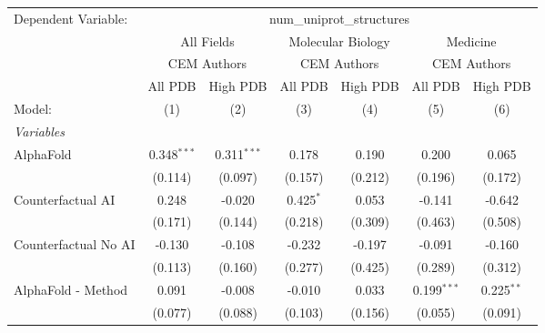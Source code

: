 \begingroup
\centering
\begin{tabular}{lcccccc}
   \tabularnewline \midrule \midrule
   Dependent Variable: & \multicolumn{6}{c}{num\_uniprot\_structures}\\
 & \multicolumn{2}{c}{All Fields} & \multicolumn{2}{c}{Molecular Biology} & \multicolumn{2}{c}{Medicine} \\
\cmidrule(lr){2-3} \cmidrule(lr){4-5} \cmidrule(lr){6-7}
 & \multicolumn{2}{c}{CEM Authors} & \multicolumn{2}{c}{CEM Authors} & \multicolumn{2}{c}{CEM Authors} \\
\cmidrule(lr){2-3} \cmidrule(lr){4-5} \cmidrule(lr){6-7}
 & \multicolumn{1}{c}{All PDB} & \multicolumn{1}{c}{High PDB} & \multicolumn{1}{c}{All PDB} & \multicolumn{1}{c}{High PDB} & \multicolumn{1}{c}{All PDB} & \multicolumn{1}{c}{High PDB} \\
\cmidrule(lr){2-2} \cmidrule(lr){3-3} \cmidrule(lr){4-4} \cmidrule(lr){5-5} \cmidrule(lr){6-6} \cmidrule(lr){7-7}
   Model:                                                     & (1)           & (2)           & (3)          & (4)     & (5)            & (6)\\  
   \midrule
   \emph{Variables}\\
   AlphaFold                                                  & 0.348$^{***}$ & 0.311$^{***}$ & 0.178        & 0.190   & 0.200          & 0.065\\   
                                                              & (0.114)       & (0.097)       & (0.157)      & (0.212) & (0.196)        & (0.172)\\   
   Counterfactual AI                                          & 0.248         & -0.020        & 0.425$^{*}$  & 0.053   & -0.141         & -0.642\\   
                                                              & (0.171)       & (0.144)       & (0.218)      & (0.309) & (0.463)        & (0.508)\\   
   Counterfactual No AI                                       & -0.130        & -0.108        & -0.232       & -0.197  & -0.091         & -0.160\\   
                                                              & (0.113)       & (0.160)       & (0.277)      & (0.425) & (0.289)        & (0.312)\\   
   AlphaFold - Method                                         & 0.091         & -0.008        & -0.010       & 0.033   & 0.199$^{***}$  & 0.225$^{**}$\\   
                                                              & (0.077)       & (0.088)       & (0.103)      & (0.156) & (0.055)        & (0.091)\\   

\end{tabular}
